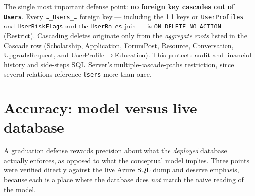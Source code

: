 \documentclass[11pt,a4paper]{article}
\begin{document}
The single most important defense point: \textbf{no foreign key cascades out of
\texttt{Users}}. Every \texttt{\dots\_Users\_\dots} foreign key --- including the
1:1 keys on \texttt{UserProfiles} and \texttt{UserRiskFlags} and the
\texttt{UserRoles} join --- is \texttt{ON DELETE NO ACTION} (Restrict).
Cascading deletes originate only from the \emph{aggregate roots} listed in the
Cascade row (Scholarship, Application, ForumPost, Resource, Conversation,
UpgradeRequest, and UserProfile$\rightarrow$Education). This protects audit and
financial history and side-steps SQL~Server's multiple-cascade-paths
restriction, since several relations reference \texttt{Users} more than once.

\section{Accuracy: model versus live database}
\label{sec:accuracy}

A graduation defense rewards precision about what the \emph{deployed} database
actually enforces, as opposed to what the conceptual model implies. Three points
were verified directly against the live Azure SQL dump and deserve emphasis,
because each is a place where the database does \emph{not} match the naive
reading of the model.
\end{document}

